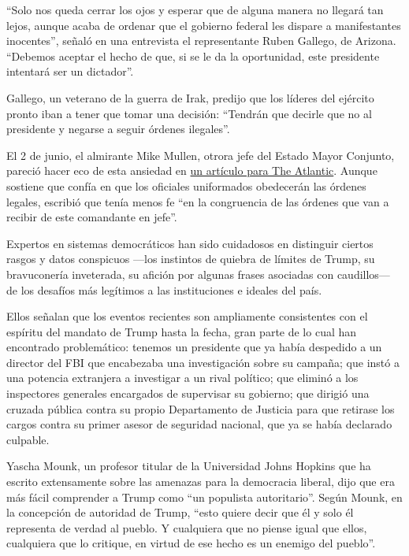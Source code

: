 ``Solo nos queda cerrar los ojos y esperar que de alguna manera no
llegará tan lejos, aunque acaba de ordenar que el gobierno federal les
dispare a manifestantes inocentes'', señaló en una entrevista el
representante Ruben Gallego, de Arizona. ``Debemos aceptar el hecho de
que, si se le da la oportunidad, este presidente intentará ser un
dictador''.

Gallego, un veterano de la guerra de Irak, predijo que los líderes del
ejército pronto iban a tener que tomar una decisión: ``Tendrán que
decirle que no al presidente y negarse a seguir órdenes ilegales''.

El 2 de junio, el almirante Mike Mullen, otrora jefe del Estado Mayor
Conjunto, pareció hacer eco de esta ansiedad en
\href{https://www.theatlantic.com/ideas/archive/2020/06/american-cities-are-not-battlespaces/612553/}{un
artículo para The Atlantic}. Aunque sostiene que confía en que los
oficiales uniformados obedecerán las órdenes legales, escribió que tenía
menos fe ``en la congruencia de las órdenes que van a recibir de este
comandante en jefe''.

Expertos en sistemas democráticos han sido cuidadosos en distinguir
ciertos rasgos y datos conspicuos ---los instintos de quiebra de límites
de Trump, su bravuconería inveterada, su afición por algunas frases
asociadas con caudillos--- de los desafíos más legítimos a las
instituciones e ideales del país.

Ellos señalan que los eventos recientes son ampliamente consistentes con
el espíritu del mandato de Trump hasta la fecha, gran parte de lo cual
han encontrado problemático: tenemos un presidente que ya había
despedido a un director del FBI que encabezaba una investigación sobre
su campaña; que instó a una potencia extranjera a investigar a un rival
político; que eliminó a los inspectores generales encargados de
supervisar su gobierno; que dirigió una cruzada pública contra su propio
Departamento de Justicia para que retirase los cargos contra su primer
asesor de seguridad nacional, que ya se había declarado culpable.

Yascha Mounk, un profesor titular de la Universidad Johns Hopkins que ha
escrito extensamente sobre las amenazas para la democracia liberal, dijo
que era más fácil comprender a Trump como ``un populista autoritario''.
Según Mounk, en la concepción de autoridad de Trump, ``esto quiere decir
que él y solo él representa de verdad al pueblo. Y cualquiera que no
piense igual que ellos, cualquiera que lo critique, en virtud de ese
hecho es un enemigo del pueblo''.


